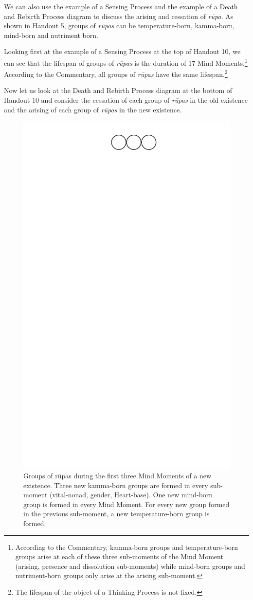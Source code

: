 We can also use the example of a Sensing Process and the example of a Death and Rebirth Process diagram to discuss the arising and cessation of \textit{rūpa}. As shown in Handout 5, groups of \textit{rūpas} can be temperature-born, kamma-born, mind-born and nutriment born.

Looking first at the example of a Sensing Process at the top of Handout 10, we can see that the lifespan of groups of \textit{rūpas} is the duration of 17 Mind Moments.\footnote{According to the Commentary, kamma-born groups and temperature-born groups arise at each of these three sub-moments of the Mind Moment (arising, presence and dissolution sub-moments) while mind-born groups and nutriment-born groups only arise at the arising sub-moment.} According to the Commentary, all groups of \textit{rūpas} have the same lifespan.\footnote{The lifespan of the object of a Thinking Process is not fixed.}

Now let us look at the Death and Rebirth Process diagram at the bottom of Handout 10 and consider the cessation of each group of \textit{rūpas} in the old existence and the arising of each group of \textit{rūpas} in the new existence. 

\begin{figure}[h]
\centering
\includegraphics[width=0.5\linewidth]{./Diagrams/NewRupa}
\caption{Groups of rūpas during the first three Mind Moments of a new existence. Three new kamma-born groups are formed in every sub-moment (vital-nonad, gender, Heart-base). One new mind-born group is formed in every Mind Moment. For every new group formed in the previous sub-moment, a new temperature-born group is formed.}
\label{fig:NewRupa}
\end{figure}

